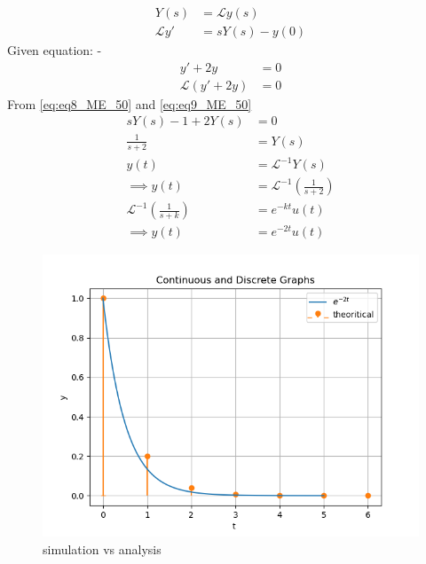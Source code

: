 \documentclass[journal,12pt,twocolumn]{IEEEtran}
\begin{document}
\begin{align}
\label{eq:eq8_ME_50}
Y(s)&=\mathcal{L}y(s)\\
\label{eq:eq9_ME_50}
\mathcal{L}y'&=sY(s)-y(0)
\end{align}
Given equation: -
\begin{align}
y'+2y&=0\\
\mathcal{L}(y'+2y)&=0
\end{align}
From \eqref{eq:eq8_ME_50} and \eqref{eq:eq9_ME_50}
\begin{align}
sY(s)-1+2Y(s)&=0\\
\frac{1}{s+2}&=Y(s)\\
y(t)&=\mathcal{L}^{-1}Y(s)\\
\implies y(t)&=\mathcal{L}^{-1}\left(\frac{1}{s+2}\right)\\
\mathcal{L}^{-1}\left(\frac{1}{s+k}\right)&=e^{-kt}u(t)\\
\implies y(t)&=e^{-2t}u(t) 
\end{align}
\begin{figure}[h!]
    \centering
    \includegraphics[width=\columnwidth]{2023/ME/50/figs/graph.png}
    \caption{simulation vs analysis}
\end{figure}
\end{document}
